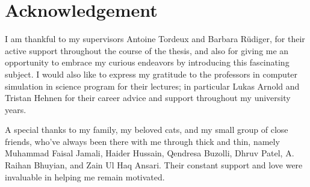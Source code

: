 \section*{Acknowledgement}

I am thankful to my supervisors Antoine Tordeux and Barbara Rüdiger, for their active support throughout the course of the thesis, and also for giving me an opportunity to embrace my curious endeavors by introducing this fascinating subject. I would also like to express my gratitude to the professors in computer simulation in science program for their lectures; in particular Lukas Arnold and Tristan Hehnen for their career advice and support throughout my university years.

A special thanks to my family, my beloved cats, and my small group of close friends, who've always been there with me through thick and thin, namely Muhammad Faisal Jamali, Haider Hussain, Qendresa Buzolli, Dhruv Patel, A. Raihan Bhuyian, and Zain Ul Haq Ansari. Their constant support and love were invaluable in helping me remain motivated.